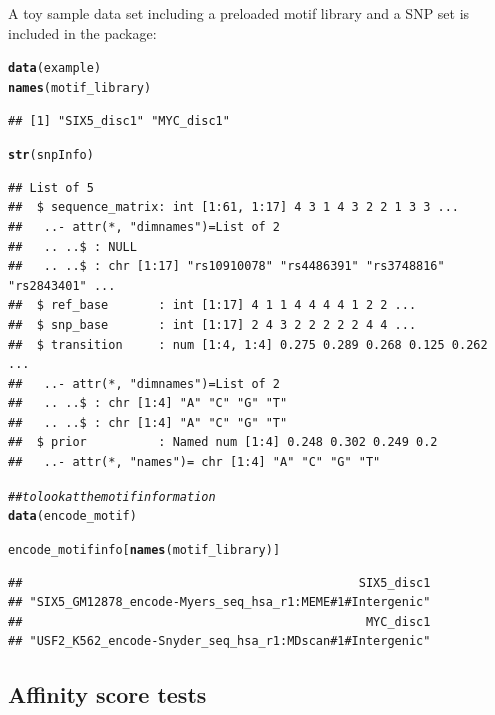 \documentclass[a4paper,10pt]{article}\usepackage[]{graphicx}\usepackage[]{color}
\makeatletter
\newcommand{\hlcom}[1]{\textcolor[rgb]{0.678,0.584,0.686}{\textit{#1}}}%
\newcommand{\hlstd}[1]{\textcolor[rgb]{0.345,0.345,0.345}{#1}}%
\newcommand{\hlkwd}[1]{\textcolor[rgb]{0.737,0.353,0.396}{\textbf{#1}}}%
\newenvironment{kframe}{%
 \def\at@end@of@kframe{}%
 \ifinner\ifhmode%
  \def\at@end@of@kframe{\end{minipage}}%
  \begin{minipage}{\columnwidth}%
 \fi\fi%
 \def\FrameCommand##1{\hskip\@totalleftmargin \hskip-\fboxsep
 \colorbox{shadecolor}{##1}\hskip-\fboxsep
     \hskip-\linewidth \hskip-\@totalleftmargin \hskip\columnwidth}%
 \MakeFramed {\advance\hsize-\width
   \@totalleftmargin\z@ \linewidth\hsize
   \@setminipage}}%
 {\par\unskip\endMakeFramed%
 \at@end@of@kframe}
\newenvironment{knitrout}{}{} %
\makeatother
\begin{document}
A toy sample data set including a preloaded motif library and a SNP set is included in the package:

\begin{knitrout}
\color{fgcolor}\begin{kframe}
\begin{alltt}
\hlkwd{data}\hlstd{(example)}
\hlkwd{names}\hlstd{(motif_library)}
\end{alltt}
\begin{verbatim}
## [1] "SIX5_disc1" "MYC_disc1"
\end{verbatim}
\begin{alltt}
\hlkwd{str}\hlstd{(snpInfo)}
\end{alltt}
\begin{verbatim}
## List of 5
##  $ sequence_matrix: int [1:61, 1:17] 4 3 1 4 3 2 2 1 3 3 ...
##   ..- attr(*, "dimnames")=List of 2
##   .. ..$ : NULL
##   .. ..$ : chr [1:17] "rs10910078" "rs4486391" "rs3748816" "rs2843401" ...
##  $ ref_base       : int [1:17] 4 1 1 4 4 4 4 1 2 2 ...
##  $ snp_base       : int [1:17] 2 4 3 2 2 2 2 2 4 4 ...
##  $ transition     : num [1:4, 1:4] 0.275 0.289 0.268 0.125 0.262 ...
##   ..- attr(*, "dimnames")=List of 2
##   .. ..$ : chr [1:4] "A" "C" "G" "T"
##   .. ..$ : chr [1:4] "A" "C" "G" "T"
##  $ prior          : Named num [1:4] 0.248 0.302 0.249 0.2
##   ..- attr(*, "names")= chr [1:4] "A" "C" "G" "T"
\end{verbatim}
\begin{alltt}
\hlcom{## to look at the motif information}
\hlkwd{data}\hlstd{(encode_motif)}
\end{alltt}


{\ttfamily\noindent\color{warningcolor}{\#\# Warning in data(encode\_motif): data set 'encode\_motif' not found}}\begin{alltt}
\hlstd{encode_motifinfo[}\hlkwd{names}\hlstd{(motif_library)]}
\end{alltt}
\begin{verbatim}
##                                               SIX5_disc1 
## "SIX5_GM12878_encode-Myers_seq_hsa_r1:MEME#1#Intergenic" 
##                                                MYC_disc1 
## "USF2_K562_encode-Snyder_seq_hsa_r1:MDscan#1#Intergenic"
\end{verbatim}
\end{kframe}
\end{knitrout}


\subsection{Affinity score tests}
\end{document}
